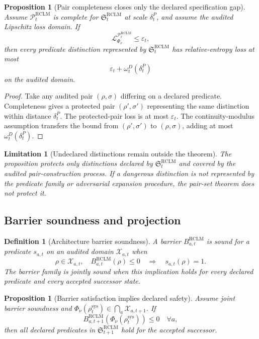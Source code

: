 \documentclass[11pt,a4paper]{article}
\newtheorem{proposition}[theorem]{Proposition}
\newtheorem{definition}[theorem]{Definition}
\newtheorem{limitation}[theorem]{Limitation}
\newcommand{\Lcal}{\mathcal L}
\newcommand{\Pcal}{\mathcal P}
\newcommand{\Xcal}{\mathcal X}
\newcommand{\eps}{\varepsilon}
\newcommand{\RCLM}{\mathrm{RCLM}}
\newcommand{\sys}{\mathrm{sys}}
\begin{document}
\begin{proposition}[Pair completeness closes only the declared specification gap]
\label{prop:rclm-pair-completeness}
Assume \(\Pcal_t^{\RCLM}\) is complete for \(\mathfrak S_t^{\RCLM}\) at scale \(\delta_t^P\), and assume the audited Lipschitz loss domain. If
\[
\Lcal^{\Pcal_t^{\RCLM}}_{\Phi_\nu}\le\eps_t,
\]
then every predicate distinction represented by \(\mathfrak S_t^{\RCLM}\) has relative-entropy loss at most
\[
\eps_t+\omega_t^D(\delta_t^P)
\]
on the audited domain.
\end{proposition}

\begin{proof}
Take any audited pair \((\rho,\sigma)\) differing on a declared predicate. Completeness gives a protected pair \((\rho',\sigma')\) representing the same distinction within distance \(\delta_t^P\). The protected-pair loss is at most \(\eps_t\). The continuity-modulus assumption transfers the bound from \((\rho',\sigma')\) to \((\rho,\sigma)\), adding at most \(\omega_t^D(\delta_t^P)\).
\end{proof}

\begin{limitation}[Undeclared distinctions remain outside the theorem]
The proposition protects only distinctions declared by \(\mathfrak S_t^{\RCLM}\) and covered by the audited pair-construction process. If a dangerous distinction is not represented by the predicate family or adversarial expansion procedure, the pair-set theorem does not protect it.
\end{limitation}

\subsection{Barrier soundness and projection}

\begin{definition}[Architecture barrier soundness]
A barrier \(B_{a,t}^{\RCLM}\) is sound for a predicate \(s_{a,t}\) on an audited domain \(\Xcal_{a,t}\) when
\[
\rho\in\Xcal_{a,t},\quad B_{a,t}^{\RCLM}(\rho)\le0
\quad\Longrightarrow\quad
s_{a,t}(\rho)=1.
\]
The barrier family is jointly sound when this implication holds for every declared predicate and every accepted successor state.
\end{definition}

\begin{proposition}[Barrier satisfaction implies declared safety]
Assume joint barrier soundness and \(\Phi_\nu(\rho_t^{\sys})\in\bigcap_a\Xcal_{a,t+1}\). If
\[
B_{a,t+1}^{\RCLM}(\Phi_\nu(\rho_t^{\sys}))\le0
\quad\forall a,
\]
then all declared predicates in \(\mathfrak S_{t+1}^{\RCLM}\) hold for the accepted successor.
\end{proposition}
\end{document}
